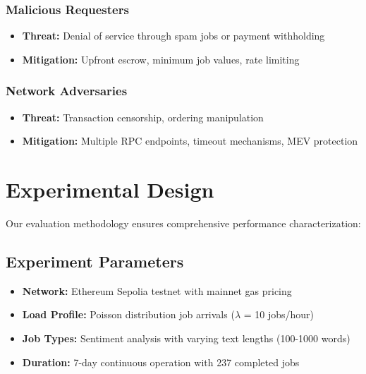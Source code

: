 \subsubsection{Malicious Requesters}
\begin{itemize}
    \item \textbf{Threat:} Denial of service through spam jobs or payment withholding
    \item \textbf{Mitigation:} Upfront escrow, minimum job values, rate limiting
\end{itemize}

\subsubsection{Network Adversaries}
\begin{itemize}
    \item \textbf{Threat:} Transaction censorship, ordering manipulation
    \item \textbf{Mitigation:} Multiple RPC endpoints, timeout mechanisms, MEV protection
\end{itemize}

\section{Experimental Design}

Our evaluation methodology ensures comprehensive performance characterization:

\subsection{Experiment Parameters}
\begin{itemize}
    \item \textbf{Network:} Ethereum Sepolia testnet with mainnet gas pricing
    \item \textbf{Load Profile:} Poisson distribution job arrivals ($\lambda$ = 10 jobs/hour)
    \item \textbf{Job Types:} Sentiment analysis with varying text lengths (100-1000 words)
    \item \textbf{Duration:} 7-day continuous operation with 237 completed jobs
\end{itemize}

